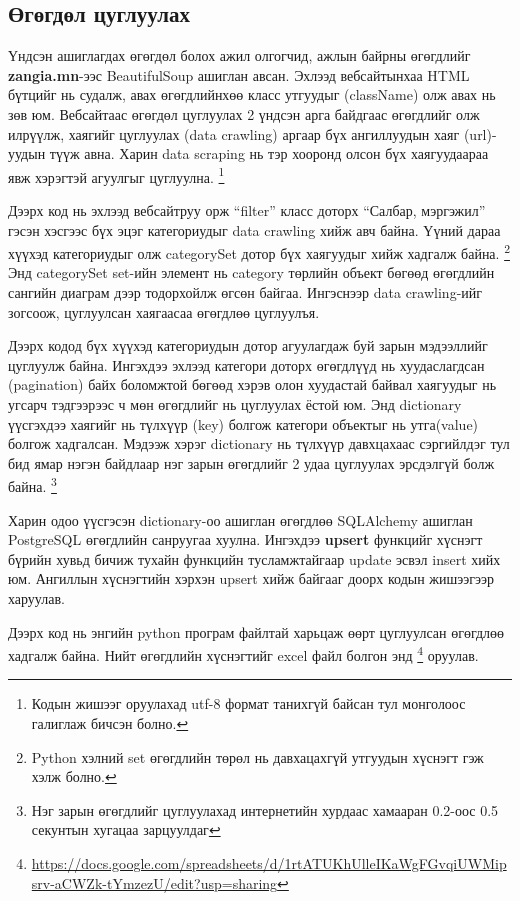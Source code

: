 \subsection{Өгөгдөл цуглуулах}
Үндсэн ашиглагдах өгөгдөл болох ажил олгогчид, ажлын байрны өгөгдлийг \textbf{zangia.mn}-ээс BeautifulSoup ашиглан авсан. Эхлээд вебсайтынхаа HTML бүтцийг нь судалж, авах өгөгдлийнхөө класс утгуудыг (className) олж авах нь зөв юм. Вебсайтаас өгөгдөл цуглуулах 2 үндсэн арга байдгаас өгөгдлийг олж илрүүлж, хаягийг цуглуулах (data crawling) аргаар бүх ангиллуудын хаяг (url)-уудын түүж авна. Харин data scraping нь тэр хооронд олсон бүх хаягуудаараа явж хэрэгтэй агуулгыг цуглуулна. \footnote{Кодын жишээг оруулахад utf-8 формат танихгүй байсан тул монголоос галиглаж бичсэн болно.}

Дээрх код нь эхлээд вебсайтруу орж ``filter'' класс доторх ``Салбар, мэргэжил'' гэсэн хэсгээс бүх эцэг категориудыг data crawling хийж авч байна. Үүний дараа хүүхэд категориудыг олж categorySet дотор бүх хаягуудыг хийж хадгалж байна. \footnote{Python хэлний set өгөгдлийн төрөл нь давхацахгүй утгуудын хүснэгт гэж хэлж болно. } Энд categorySet set-ийн элемент нь category төрлийн объект бөгөөд өгөгдлийн сангийн диаграм дээр тодорхойлж өгсөн байгаа. Ингэснээр data crawling-ийг зогсоож, цуглуулсан хаягаасаа өгөгдлөө цуглуулъя.  

Дээрх кодод бүх хүүхэд категориудын дотор агуулагдаж буй зарын мэдээллийг цуглуулж байна. Ингэхдээ эхлээд категори доторх өгөгдлүүд нь хуудаслагдсан (pagination) байх боломжтой бөгөөд хэрэв олон хуудастай байвал хаягуудыг нь угсарч тэдгээрээс ч мөн өгөгдлийг нь цуглуулах ёстой юм. 
Энд dictionary үүсгэхдээ хаягийг нь түлхүүр (key) болгож категори объектыг нь утга(value) болгож хадгалсан. Мэдээж хэрэг dictionary нь түлхүүр давхцахаас сэргийлдэг тул бид ямар нэгэн байдлаар нэг зарын өгөгдлийг 2 удаа цуглуулах эрсдэлгүй болж байна. \footnote{Нэг зарын өгөгдлийг цуглуулахад интернетийн хурдаас хамааран 0.2-оос 0.5 секунтын хугацаа зарцуулдаг}

Харин одоо үүсгэсэн dictionary-оо ашиглан өгөгдлөө SQLAlchemy ашиглан PostgreSQL өгөгдлийн санруугаа хуулна. Ингэхдээ \textbf{upsert} функцийг хүснэгт бүрийн хувьд бичиж тухайн функцийн тусламжтайгаар update эсвэл insert хийх юм. Ангиллын хүснэгтийн хэрхэн upsert хийж байгааг доорх кодын жишээгээр харуулав. 

Дээрх код нь энгийн python програм файлтай харьцаж өөрт цуглуулсан өгөгдлөө хадгалж байна. Нийт өгөгдлийн хүснэгтийг excel файл болгон энд \footnote{\url{https://docs.google.com/spreadsheets/d/1rtATUKhUlleIKaWgFGvqiUWMipsrv-aCWZk-tYmzezU/edit?usp=sharing}} оруулав.
